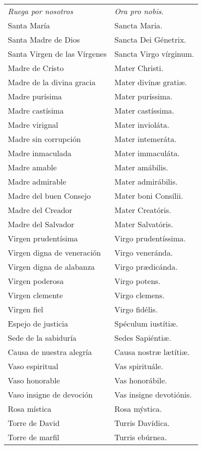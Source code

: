 \documentclass[./rosary.tex]{subfiles}
\begin{document}
\begin{longtable} { p{} p{} }
    \emph{Ruega por nosotros} & \emph{Ora pro nobis}.\\
    Santa María & Sancta Maria.\\
    Santa Madre de Dios & Sancta Dei Génetrix.\\
    Santa Virgen de las Vírgenes & Sancta Virgo vírginum.\\
    Madre de Cristo & Mater Christi.\\
    Madre de la divina gracia & Mater divínæ gratiæ.\\
    Madre purísima & Mater puríssima.\\
    Madre castísima & Mater castíssima.\\
    Madre virignal & Mater invioláta.\\
    Madre sin corrupción & Mater intemeráta.\\
    Madre inmaculada & Mater immaculáta.\\
    Madre amable & Mater amábilis.\\
    Madre admirable & Mater admirábilis.\\
    Madre del buen Consejo & Mater boni Consílii.\\
    Madre del Creador & Mater Creatóris.\\
    Madre del Salvador & Mater Salvatóris.\\
    Virgen prudentísima & Virgo pru­den­tíssima.\\
    Virgen digna de veneración & Virgo veneránda.\\
    Virgen digna de alabanza & Virgo prædicánda.\\
    Virgen poderosa & Virgo potens.\\
    Virgen clemente & Virgo clemens.\\
    Virgen fiel & Virgo fidélis.\\
    Espejo de justicia & Spéculum iustítiæ.\\
    Sede de la sabiduría & Sedes Sapiéntiæ.\\
    Causa de nuestra alegría & Causa nostræ lætítiæ.\\
    Vaso espiritual & Vas spirituále.\\
    Vaso honorable & Vas honorábile.\\
    Vaso insigne de devoción & Vas insigne devotiónis.\\
    Rosa mística & Rosa mýstica.\\
    Torre de David & Turris Davídica.\\
    Torre de marfil & Turris ebúrnea.\\

\end{longtable}
\end{document}
